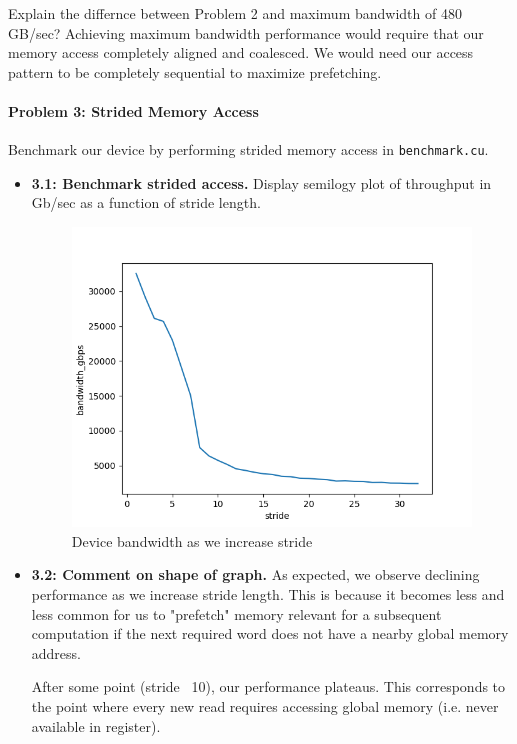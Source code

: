 \documentclass[12pt,letterpaper,twoside]{article}
\begin{document}
\begin{itemize}
    Explain the differnce between Problem 2 and maximum bandwidth of 480 GB/sec? 
    Achieving maximum bandwidth performance would require that our memory access
    completely aligned and coalesced. We would need our access pattern to 
    be completely sequential to maximize prefetching.

\end{itemize}


\paragraph{Problem 3: Strided Memory Access} Benchmark our device by performing
strided memory access in \texttt{benchmark.cu}.

\begin{itemize}
    \item \textbf{3.1: Benchmark strided access.} Display semilogy plot of 
    throughput in Gb/sec as a function of stride length. 

    \begin{figure}[h]
        \center
        \includegraphics[scale=0.7]{q3_1.png}
        \caption{Device bandwidth as we increase stride}
    \end{figure}

    \item \textbf{3.2: Comment on shape of graph.} As expected, we observe 
    declining performance as we increase stride length. This is because 
    it becomes less and less common for us to "prefetch" memory relevant 
    for a subsequent computation if the next required word does not have a 
    nearby global memory address.

    After some point (stride ~10), our performance plateaus. This corresponds 
    to the point where every new read requires accessing global memory (i.e. 
    never available in register).

\end{itemize}
\end{document}
